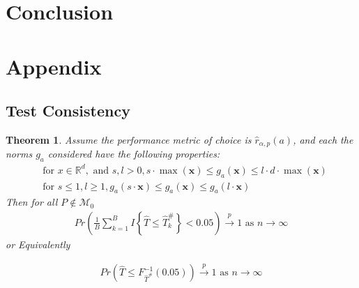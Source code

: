 \documentclass{article}
\newtheorem{theorem}{Theorem}
\begin{document}
\section{Conclusion}

\section{Appendix}

\subsection{Test Consistency}
\label{sec:test_cnsty}

\begin{theorem}
\label{thm:cnst}
Assume the performance metric of choice is $\hat{r}_{\alpha, p}(a)$, and each the norms $g_a$ considered have the following properties: 
\begin{align}
& \text{for } x \in \mathbb{R}^d, \text{ and } s, l > 0, s \cdot \max({\boldsymbol{x}}) \leq g_a(\boldsymbol{x}) \leq l \cdot d \cdot \max({\boldsymbol{x}}) \label{eqn:nrm_bounds}\\
& \text{for } s \leq 1, l \geq 1, g_a(s \cdot \boldsymbol{x}) \leq g_a(\boldsymbol{x}) \leq g_a(l \cdot \boldsymbol{x}) \label{eqn:linegrowth}
\end{align}
Then for all $P \not \in \mathscr{M}_0$ 
\begin{align*}
	Pr \left(\frac{1}{B}\sum_{k = 1}^B I\left\{\hat{T} \leq \hat{T}_k^{\#}\right\} < 0.05\right) \xrightarrow{p} 1 \text{ as } n \to \infty
\end{align*}
or Equivalently 

\begin{align*}
Pr\left(\hat{T} \leq F^{-1}_{\hat{T}^\#}(0.05)\right) \xrightarrow{p} 1 \text{ as } n \to \infty
\end{align*}
\end{theorem}
\end{document}
